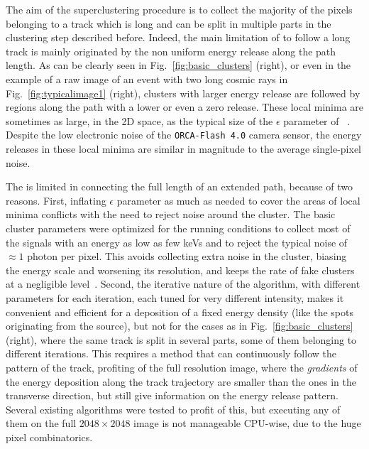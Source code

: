 The aim of the superclustering procedure is to collect the majority of
the pixels belonging to a track which is long and can be split in
multiple parts in the clustering step described before.  Indeed, the
main limitation of \idbscan to follow a long track is mainly
originated by the non uniform energy release along the path length.
As can be clearly seen in Fig.~\ref{fig:basic_clusters} (right), or
even in the example of a raw image of an event with two long cosmic
rays in Fig.~\ref{fig:typicalimage1} (right), clusters with larger
energy release are followed by regions along the path with a lower or
even a zero release.  These local minima are sometimes as large, in
the 2D space, as the typical size of the $\epsilon$ parameter of
\dbscan~\cite{dbscan}. Despite the low electronic noise of the
\texttt{ORCA-Flash 4.0} camera sensor, the energy releases in these local
minima are similar in magnitude to the average single-pixel noise.

The \idbscan is limited in connecting the full length of an extended
path, because of two reasons. First, inflating $\epsilon$ parameter as
much as needed to cover the areas of local minima conflicts with the
need to reject noise around the cluster.  The basic cluster parameters
were optimized for the \lemon running conditions to collect most of
the signals with an energy as low as few keVs and to reject the
typical noise of $\approx 1$ photon per pixel. This avoids collecting
extra noise in the cluster, biasing the energy scale and worsening its
resolution, and keeps the rate of fake clusters at a negligible
level~\cite{iDBSCAN}.  Second, the iterative nature of the algorithm,
with different parameters for each iteration, each tuned for very
different intensity, makes it convenient and efficient for a
deposition of a fixed energy density (like the spots originating from
the \fe source), but not for the cases as in
Fig.~\ref{fig:basic_clusters} (right), where the same track is split
in several parts, some of them belonging to different iterations.
This requires a method that can continuously follow the pattern of the
track, profiting of the full resolution image, where the {\it
gradients} of the energy deposition along the track trajectory are
smaller than the ones in the transverse direction, but still give
information on the energy release pattern. Several existing algorithms
were tested to profit of this, but executing any of them on the full
$2048{\times}2048$ image is not manageable CPU-wise, due to the huge
pixel combinatorics.

